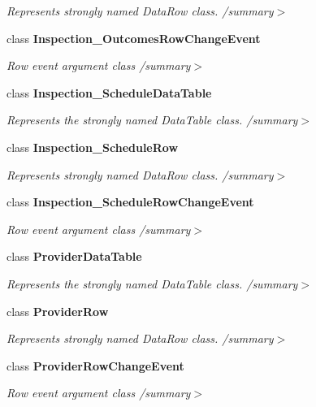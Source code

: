 \begin{DoxyCompactItemize}
\begin{DoxyCompactList}\small\item\em Represents strongly named Data\+Row class. /summary$>$ \end{DoxyCompactList}\item 
class \textbf{ Inspection\+\_\+\+Outcomes\+Row\+Change\+Event}
\begin{DoxyCompactList}\small\item\em Row event argument class /summary$>$ \end{DoxyCompactList}\item 
class \textbf{ Inspection\+\_\+\+Schedule\+Data\+Table}
\begin{DoxyCompactList}\small\item\em Represents the strongly named Data\+Table class. /summary$>$ \end{DoxyCompactList}\item 
class \textbf{ Inspection\+\_\+\+Schedule\+Row}
\begin{DoxyCompactList}\small\item\em Represents strongly named Data\+Row class. /summary$>$ \end{DoxyCompactList}\item 
class \textbf{ Inspection\+\_\+\+Schedule\+Row\+Change\+Event}
\begin{DoxyCompactList}\small\item\em Row event argument class /summary$>$ \end{DoxyCompactList}\item 
class \textbf{ Provider\+Data\+Table}
\begin{DoxyCompactList}\small\item\em Represents the strongly named Data\+Table class. /summary$>$ \end{DoxyCompactList}\item 
class \textbf{ Provider\+Row}
\begin{DoxyCompactList}\small\item\em Represents strongly named Data\+Row class. /summary$>$ \end{DoxyCompactList}\item 
class \textbf{ Provider\+Row\+Change\+Event}
\begin{DoxyCompactList}\small\item\em Row event argument class /summary$>$ \end{DoxyCompactList}\end{DoxyCompactItemize}
